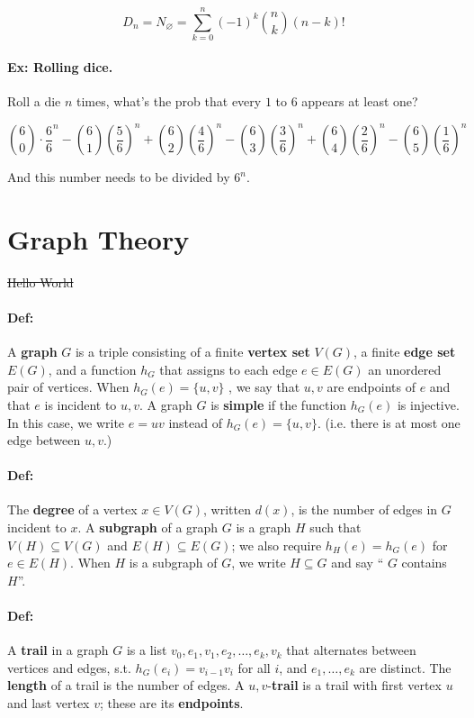 \documentclass[a4paper, 11pt, twoside]{article}
\begin{document}
\[D_n=N_{\varnothing} = \sum^n_{k=0}(-1)^k{n\choose k}(n-k)!\]

\paragraph{Ex: Rolling dice.} Roll a die $n$ times, what's the prob that every $1$ to $6$ appears at least one?

\[{6\choose 0}\cdot \frac66^n-{6\choose 1}\left(\frac{5}{6}\right)^n+{6\choose 2}\left(\frac{4}{6}\right)^n-{6\choose 3}\left(\frac{3}{6}\right)^n+{6\choose 4}\left(\frac{2}{6}\right)^n-{6\choose 5}\left(\frac{1}{6}\right)^n\]

And this number needs to be divided by $6^n$.

\section{Graph Theory}

\sout{Hello World}

\paragraph{Def:} A \textbf{graph} $G$ is a triple consisting of a finite \textbf{vertex set} $V(G)$, a finite \textbf{edge set} $E(G)$, and a function $h_G$ that assigns to each edge $e\in E(G)$ an unordered pair of vertices. When $h_G(e)=\{u, v\}$ , we say that $u,v$ are endpoints of $e$ and that $e$ is incident to $u,v$. A graph $G$ is \textbf{simple} if the function $h_G(e)$ is injective. In this case, we write $e=uv$ instead of $h_G(e)=\{u, v\}$. (i.e. there is at most one edge between $u,v$.)

\paragraph{Def:} The \textbf{degree} of a vertex $x\in V(G)$, written $d(x)$, is the number of edges in $G$ incident to $x$. A \textbf{subgraph} of a graph $G$ is a graph $H$ such that $V(H)\subseteq V(G)$ and $E(H)\subseteq E(G)$; we also require $h_H(e)=h_G(e)$ for $e\in E(H)$. When $H$ is a subgraph of $G$, we write $H\subseteq G$ and say `` $G$ contains $H$''.

\paragraph{Def:} A \textbf{trail} in a graph $G$ is a list $v_0, e_1,v_1,e_2, \dots, e_k, v_k$ that alternates between vertices and edges, s.t. $h_G(e_i)=v_{i-1}v_i$ for all $i$, and $e_1,\dots, e_k$ are distinct. The \textbf{length} of a trail is the number of edges. A $u,v$-\textbf{trail} is a trail with first vertex $u$ and last vertex $v$; these are its \textbf{endpoints}.
\end{document}
